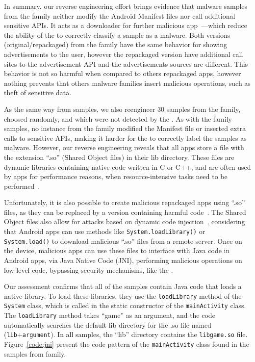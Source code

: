 In summary, our reverse engineering effort brings evidence that malware samples from the \gps family neither modify the Android Manifest files nor call additional sensitive APIs. It acts as a
downloader for further malicious app~\cite{DBLP:conf/ndss/ArpSHGR14}---which reduce the ability of the \mas to correctly classify a sample as a malware. Both versions (original/repackaged) from the \gps family have the same behavior for showing advertisements to the user,
however the repackaged version have additional call sites to the advertisement API and the advertisements sources are different. This behavior is not so harmful when compared to others repackaged apps, however nothing prevents that others malware families insert malicious operations, such as theft of sensitive data.


As the same way from \gps samples, we also reengineer 30 samples from the \rmb family, choosed randomly, and which were not detected by the \mas. As with the \gps family samples, no instance from the \rmb family modified the Manifest file or inserted extra calls to sensitive APIs, making it harder for the \mas to correctly label the samples as malware. However, our reverse engineering reveals that all apps store a file with the extension ``.so'' (Shared Object files) in their lib directory. These files are dynamic libraries containing native code written in C or C++, and are often used by apps for performance reasons, when resource-intensive tasks need to be performed~\cite{ruggia2023dark}.

Unfortunately, it is also possible to create malicious repackaged apps using ``.so'' files, as they can be replaced by a version containing harmful code~\cite{DBLP:conf/dsn/QianLSC14}. The Shared Object files also allow for attacks based on dynamic code injection~\cite{DBLP:conf/acsac/FalsinaFZKVM15}, considering that Android apps can use methods like \texttt{System.loadLibrary()} or \texttt{System.load()} to download malicious ``.so''  files from a remote server. Once on the device, malicious apps can use these files to interface with Java code in Android apps, via Java Native Code (JNI), performing malicious operations on low-level code, bypassing security mechanisms, like the \mas.


Our assessment confirms that all of the samples contain Java code that loads a native library. To load these libraries, they use the \texttt{loadLibrary} method of the \texttt{System} class, which is called in the static constructor of the \texttt{mainActivity} class. The \texttt{loadLibrary} method takes ``game'' as an argument, and the code automatically searches the default lib directory for the .so file named (\texttt{lib}+\texttt{argument}). In all samples, the ``lib'' directory contains the \texttt{libgame.so} file. Figure~\ref{code:jni} present the code pattern of the \texttt{mainActivity} class found in the samples from \rmb family.


